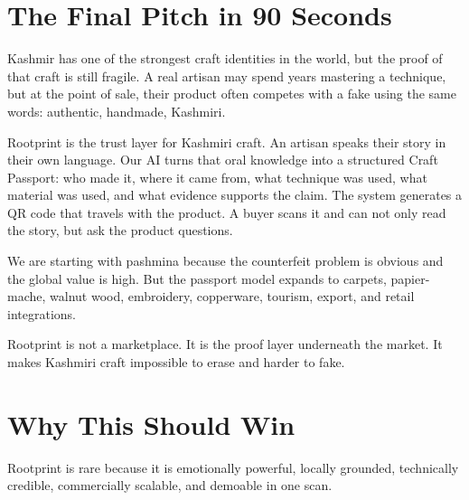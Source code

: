 \documentclass[11pt,a4paper]{article}
\begin{document}
\section{The Final Pitch in 90 Seconds}

\begin{blackbox}
Kashmir has one of the strongest craft identities in the world, but the proof of that craft is still fragile. A real artisan may spend years mastering a technique, but at the point of sale, their product often competes with a fake using the same words: authentic, handmade, Kashmiri.

Rootprint is the trust layer for Kashmiri craft. An artisan speaks their story in their own language. Our AI turns that oral knowledge into a structured Craft Passport: who made it, where it came from, what technique was used, what material was used, and what evidence supports the claim. The system generates a QR code that travels with the product. A buyer scans it and can not only read the story, but ask the product questions.

We are starting with pashmina because the counterfeit problem is obvious and the global value is high. But the passport model expands to carpets, papier-mache, walnut wood, embroidery, copperware, tourism, export, and retail integrations.

Rootprint is not a marketplace. It is the proof layer underneath the market. It makes Kashmiri craft impossible to erase and harder to fake.
\end{blackbox}

\section{Why This Should Win}

\begin{greenbox}
Rootprint is rare because it is emotionally powerful, locally grounded, technically credible, commercially scalable, and demoable in one scan.
\end{greenbox}
\end{document}
